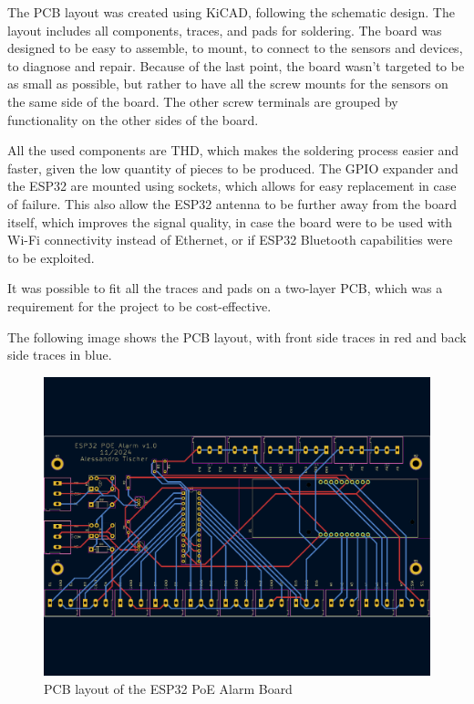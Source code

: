 \documentclass[a4paper,12pt]{article}
\begin{document}
The PCB layout was created using KiCAD, following the schematic design. The layout includes all components, traces, and pads for soldering. The board was designed to be easy to assemble, to mount, to connect to the sensors and devices, to diagnose and repair.
Because of the last point, the board wasn't targeted to be as small as possible, but rather to have all the screw mounts for the sensors on the same side of the board. The other screw terminals are grouped by functionality on the other sides of the board.

All the used components are THD, which makes the soldering process easier and faster, given the low quantity of pieces to be produced. The GPIO expander and the ESP32 are mounted using sockets, which allows for easy replacement in case of failure. This also allow the ESP32 antenna to be further away from the board itself, which improves the signal quality, in case the board were to be used with Wi-Fi connectivity instead of Ethernet, or if ESP32 Bluetooth capabilities were to be exploited.

It was possible to fit all the traces and pads on a two-layer PCB, which was a requirement for the project to be cost-effective. 

The following image shows the PCB layout, with front side traces in red and back side traces in blue. 
\begin{figure}[H]
    \centering
    \includegraphics[width=\textwidth]{Media/PCB.pdf}
    \caption{PCB layout of the ESP32 PoE Alarm Board}
    \label{fig:pcb}
\end{figure}
\end{document}
